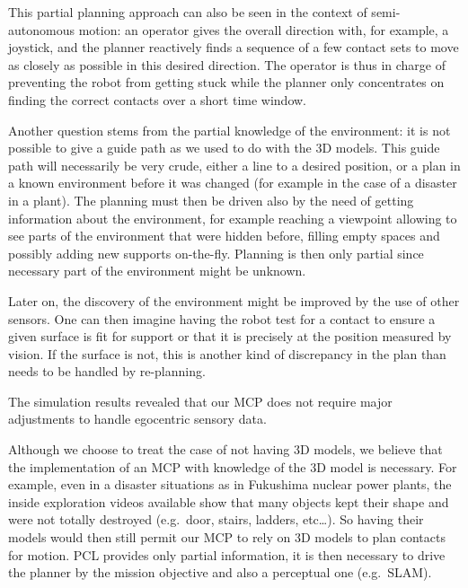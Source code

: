 This partial planning approach can also be seen in the context of semi-autonomous motion: an operator gives the overall direction with, for example, a joystick, and the planner reactively finds a sequence of a few contact sets to move as closely as possible in this desired direction.
The operator is thus in charge of preventing the robot from getting stuck while the planner only concentrates on finding the correct contacts over a short time window.

Another question stems from the partial knowledge of the environment: it is not possible to give a guide path as we used to do with the 3D models.
This guide path will necessarily be very crude, either a line to a desired position, or a plan in a known environment before it was changed (for example in the case of a disaster in a plant).
The planning must then be driven also by the need of getting information about the environment, for example reaching a viewpoint allowing to see parts of the environment that were hidden before, filling empty spaces and possibly adding new supports on-the-fly.
Planning is then only partial since necessary part of the environment might be unknown.

Later on, the discovery of the environment might be improved by the use of other sensors.
One can then imagine having the robot test for a contact to ensure a given surface is fit for support or that it is precisely at the position measured by vision.
If the surface is not, this is another kind of discrepancy in the plan than needs to be handled by re-planning.


The simulation results revealed that our MCP does not require major adjustments to handle egocentric sensory data.

Although we choose to treat the case of not having 3D models, we believe that the implementation of an MCP with knowledge of the 3D model is necessary.
For example, even in a disaster situations as in Fukushima nuclear power plants, the inside exploration videos available show that many objects kept their shape and were not totally destroyed (e.g.\ door, stairs, ladders, etc\ldots).
So having their models would then still permit our MCP to rely on 3D models to plan contacts for motion.
PCL provides only partial information, it is then necessary to drive the planner by the mission objective and also a perceptual one (e.g.\ SLAM).

